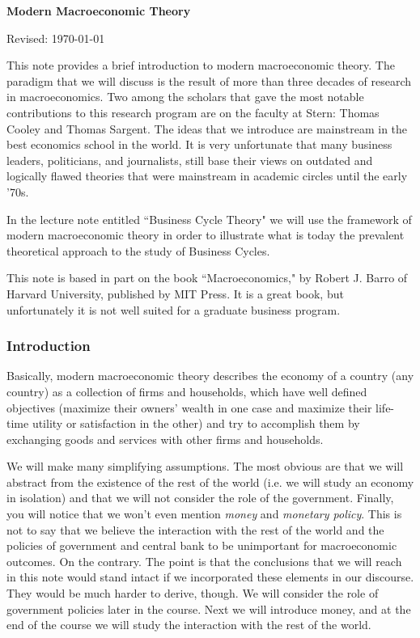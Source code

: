 \documentclass[letterpaper,12pt]{article}
\def\HeadName{Modern Macroeconomic Theory}
\begin{document}
\thispagestyle{empty}%
\Head

\centerline{\large \bf \HeadName}%
\centerline{Revised: \today}

\bigskip

This note provides a brief introduction to modern macroeconomic
theory. The paradigm that we will discuss is the result of more than
three decades of research in macroeconomics. Two among the scholars
that gave the most notable contributions to this research program
are on the faculty at Stern: Thomas Cooley and Thomas Sargent. The
ideas that we introduce are mainstream in the best economics school
in the world. It is very unfortunate that many business leaders,
politicians, and journalists, still base their views on outdated and
logically flawed theories that were mainstream in academic circles
until the early '70s.

In the lecture note entitled ``Business Cycle Theory" we will use
the framework of modern macroeconomic theory in order to
illustrate what is today the prevalent theoretical approach to the
study of Business Cycles.

This note is based in part on the book ``Macroeconomics," by
Robert J. Barro of Harvard University, published by MIT Press. It
is a great book, but unfortunately it is not well suited for a
graduate business program.

\subsubsection*{Introduction}

Basically, modern macroeconomic theory describes the economy of a
country (any country) as a collection of firms and households,
which have well defined objectives (maximize their owners' wealth
in one case and maximize their life-time utility or satisfaction
in the other) and try to accomplish them by exchanging goods and
services with other firms and households.

We will make many simplifying assumptions. The most obvious are
that we will abstract from the existence of the rest of the world
(i.e. we will study an economy in isolation) and that we will not
consider the role of the government. Finally, you will notice that
we won't even mention \textit{money} and \textit{monetary policy}.
This is not to say that we believe the interaction with the rest
of the world and the policies of government and central bank to be
unimportant for macroeconomic outcomes. On the contrary. The point
is that the conclusions that we will reach in this note would
stand intact if we incorporated these elements in our discourse.
They would be much harder to derive, though. We will consider the
role of government policies later in the course. Next we will
introduce money, and at the end of the course we will study the
interaction with the rest of the world.
\end{document}
